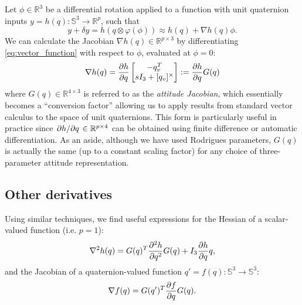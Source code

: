 \documentclass[letterpaper, 10 pt, conference]{ieeeconf}  %
\newcommand{\R}{\mathbb{R}}
\newcommand{\Q}{\mathbb{S}^3}
\newcommand{\skewmat}[1]{[#1]^\times}
\begin{document}
        Let $\phi \in \R^3$ be a differential rotation applied to a function with
        unit quaternion inputs $y = h(q): \Q \to \R^p$, such that
        \begin{equation} \label{eq:vector_function}
            y + \delta y = h(q \otimes \varphi(\phi)) \approx h(q) +  \nabla h(q) \phi.
        \end{equation}
        We can calculate the Jacobian $\nabla h(q) \in \R^{p \times 3}$ by
        differentiating \eqref{eq:vector_function} with respect to $\phi$, evaluated at
        $\phi = 0$:
        \begin{equation} \label{eq:quat_gradient}
            \nabla h(q) = \pdv{h}{q} \begin{bmatrix} 
                            -q_v^T \\ 
                            sI_3 + \skewmat{q_v}
                        \end{bmatrix}
                        := \pdv{h}{q} G(q) 
        \end{equation}
        where $G(q) \in \R^{4 \times 3}$ is referred to as the \textit{attitude Jacobian}, which
        essentially becomes a ``conversion factor'' allowing us to apply results from
        standard vector calculus to the space of unit quaternions. This form is
        particularly useful in practice since $\pdv*{h}{q} \in \R^{p \times 4}$ can be
        obtained using finite difference or automatic differentiation.
        As an aside, although we have used Rodrigues parameters, $G(q)$ is actually the
        same (up to a constant scaling factor) for any choice of three-parameter attitude
        representation.

    \subsection{Other derivatives}
        Using similar techniques, we find useful expressions for the Hessian of a
        scalar-valued function (i.e. $p = 1$):
	    \begin{equation} \label{eq:quat_hessian}
            \nabla^2 h(q) = G(q)^T \pdv[2]{h}{q} G(q) + I_3 \pdv{h}{q}q,
        \end{equation}
        and the Jacobian of a quaternion-valued function $q' = f(q) : \Q \to \Q$:
        \begin{equation} \label{eq:quat_jacobian}
            \nabla f(q) = G(q')^T \pdv{f}{q} G(q).
        \end{equation}
\end{document}
